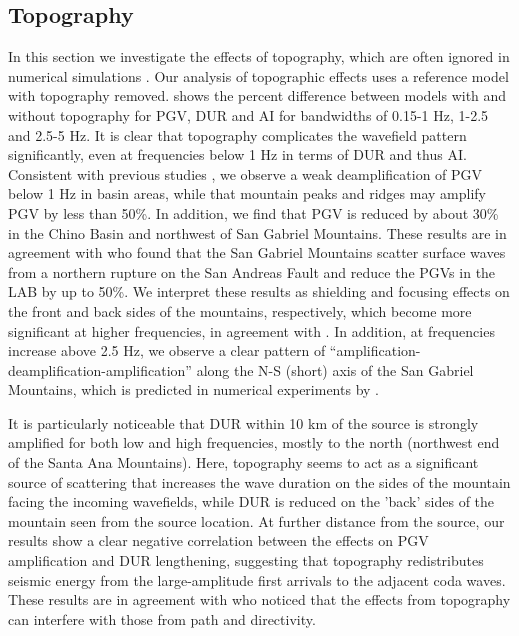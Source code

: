 \subsection{Topography}
In this section we investigate the effects of topography, which are often ignored in numerical simulations . Our analysis of topographic effects uses a reference model with topography removed.
 shows the percent difference between models with and without topography for PGV, DUR and AI for bandwidths of 0.15-1 Hz, 1-2.5 and 2.5-5 Hz. It is clear that topography complicates the wavefield pattern significantly, even at frequencies below 1 Hz in terms of DUR and thus AI. Consistent with previous studies , we observe a weak deamplification of PGV below 1 Hz in basin areas, while that mountain peaks and ridges may amplify PGV by less than 50\%. In addition, we find that PGV is reduced by about 30\% in the Chino Basin and northwest of San Gabriel Mountains. These results are in agreement with \citet{maEffectsLargeScaleSurface2007} who found that the San Gabriel Mountains scatter surface waves from a northern rupture on the San Andreas Fault and reduce the PGVs in the LAB by up to 50\%. We interpret these results as shielding and focusing effects on the front and back sides of the mountains, respectively, which become more significant at higher frequencies, in agreement with \citet{liuScatteringSeismicWaves2020}. In addition, at frequencies increase above 2.5 Hz, we observe a clear pattern of “amplification-deamplification-amplification” along the N-S (short) axis of the San Gabriel Mountains, which is predicted in numerical experiments by \citet{liuScatteringSeismicWaves2020}.

It is particularly noticeable that DUR within 10 km of the source is strongly amplified for both low and high frequencies, mostly to the north (northwest end of the Santa Ana Mountains). Here, topography seems to act as a significant source of scattering that increases the wave duration on the sides of the mountain facing the incoming wavefields, while DUR is reduced on the 'back' sides of the mountain seen from the source location. At further distance from the source, our results show a clear negative correlation between the effects on PGV amplification and DUR lengthening, suggesting that topography redistributes seismic energy from the large-amplitude first arrivals to the adjacent coda waves. These results are in agreement with \citet{leeEffectsRealisticSurface2009} who noticed that the effects from topography can interfere with those from path and directivity.



